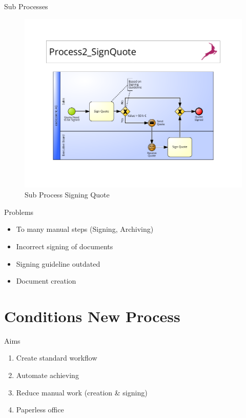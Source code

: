 \documentclass[utf8, xcolor, usenames,dvipsnames, aspectratio=169]{beamer}
\begin{document}
\begin{frame}{Sub Processes}
	\begin{figure}[t]
		\centering
		\includegraphics[height=\dimexpr11\textheight/16\relax]{./images/0-2_signQuote}
		\caption{Sub Process Signing Quote}
	\end{figure}
\end{frame}

\begin{frame}{Problems}
	\begin{itemize}
		\item To many manual steps (Signing, Archiving)		
		\item Incorrect signing of documents 
		\item Signing guideline outdated
		\item Document creation
	\end{itemize}
\end{frame}

\section{Conditions New Process}
\begin{frame}{Aims}
	\begin{enumerate}
		\item Create standard workflow
		\item Automate achieving
		\item Reduce manual work (creation \& signing)
		\item Paperless office
	\end{enumerate}
\end{frame}
\end{document}
